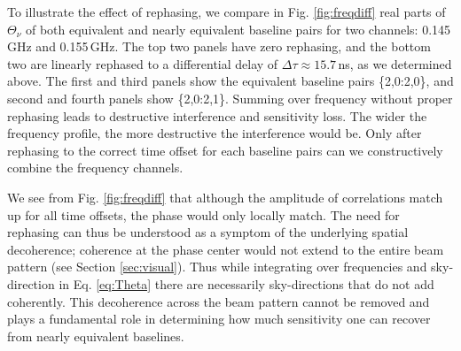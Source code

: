 \documentclass[twocolumn,apj,numberedappendix]{emulateapj}
\renewcommand\[{\begin{equation}}
\renewcommand\]{\end{equation}}
\begin{document}
To illustrate the effect of rephasing, we compare in Fig. \ref{fig:freqdiff} real parts of $\Theta_{\nu}$ of both equivalent and nearly equivalent baseline pairs for two channels: 0.145\,GHz and 0.155\,GHz. The top two panels have zero rephasing, and the bottom two are linearly rephased to a differential delay of $\Delta\tau\approx15.7$\,ns, as we determined above. The first and third panels show the equivalent baseline pairs \{2,0:2,0\}, and second and fourth panels show \{2,0:2,1\}. Summing over frequency without proper rephasing leads to destructive interference and sensitivity loss. The wider the frequency profile, the more destructive the interference would be. Only after rephasing to the correct time offset for each baseline pairs can we constructively combine the frequency channels. 

We see from Fig. \ref{fig:freqdiff} that although the amplitude of correlations match up for all time offsets, the phase would only locally match. The need for rephasing can thus be understood as a symptom of the underlying spatial decoherence; coherence at the phase center would not extend to the entire beam pattern (see Section \ref{sec:visual}). Thus while integrating over frequencies and sky-direction in Eq. \eqref{eq:Theta} there are necessarily sky-directions that do not add coherently. This decoherence across the beam pattern cannot be removed and plays a fundamental role in determining how much sensitivity one can recover from nearly equivalent baselines. 
\end{document}
